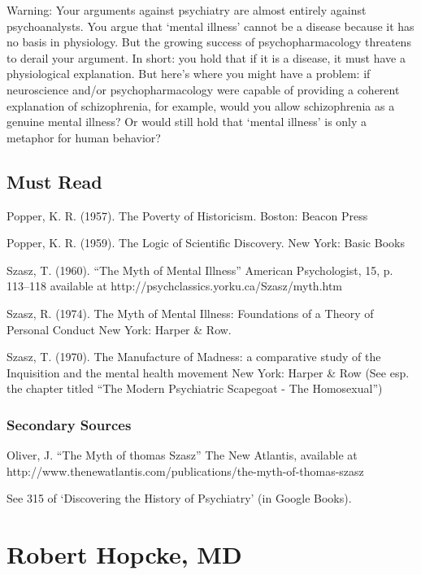 \begin{refsection}
Warning: Your arguments against psychiatry are almost entirely against psychoanalysts. You argue that `mental illness' cannot be a disease because it has no basis in physiology. But the growing success of psychopharmacology threatens to derail your argument. In short: you hold that if it is a disease, it must have a physiological explanation. But here's where you might have a problem: if neuroscience and\slash or psychopharmacology were capable of providing a coherent explanation of schizophrenia, for example, would you allow schizophrenia as a genuine mental illness? Or would still hold that `mental illness' is only a metaphor for human behavior?

\section{Must Read}
\label{mustread}

Popper, K. R. (1957). The Poverty of Historicism. Boston: Beacon Press

Popper, K. R. (1959). The Logic of Scientific Discovery. New York: Basic Books

Szasz, T. (1960). ``The Myth of Mental Illness'' American Psychologist, 15, p. 113--118 available at http:\slash \slash psychclassics.yorku.ca\slash Szasz\slash myth.htm

Szasz, R. (1974). The Myth of Mental Illness: Foundations of a Theory of Personal Conduct New York: Harper \& Row.

Szasz, T. (1970). The Manufacture of Madness: a comparative study of the Inquisition and the mental health movement New York: Harper \& Row (See esp. the chapter titled ``The Modern Psychiatric Scapegoat - The Homosexual'')

\subsection{Secondary Sources}
\label{secondarysources}

Oliver, J. ``The Myth of thomas Szasz'' The New Atlantis, available at http:\slash \slash www.thenewatlantis.com\slash publications\slash the-myth-of-thomas-szasz

See 315 of `Discovering the History of Psychiatry' (in Google Books).

\chapter{Robert Hopcke, MD}
\label{roberthopckemd}


\end{refsection}
